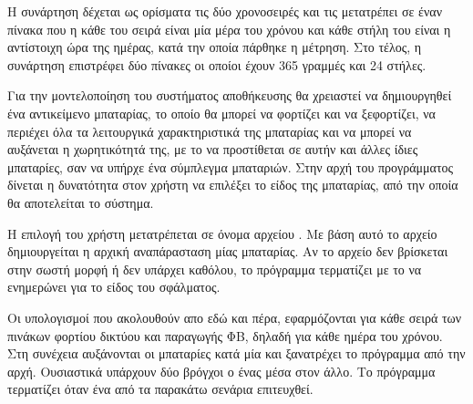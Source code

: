 \documentclass[12pt]{report}
\begin{document}
{Η συνάρτηση {} δέχεται ως ορίσματα τις δύο χρονοσειρές και τις μετατρέπει σε έναν πίνακα που η κάθε του σειρά
είναι μία μέρα του χρόνου και κάθε στήλη του είναι η αντίστοιχη ώρα της ημέρας, κατά την οποία πάρθηκε η μέτρηση. 
Στο τέλος, η συνάρτηση επιστρέφει δύο πίνακες οι οποίοι έχουν 365 γραμμές και 24 στήλες.

Για την μοντελοποίηση του συστήματος αποθήκευσης θα χρειαστεί να δημιουργηθεί ένα αντικείμενο μπαταρίας, το οποίο θα 
μπορεί να φορτίζει και να ξεφορτίζει, να περιέχει όλα τα λειτουργικά χαρακτηριστικά της μπαταρίας και να μπορεί να αυξάνεται
η χωρητικότητά της, με το να προστίθεται σε αυτήν και άλλες ίδιες μπαταρίες, σαν να υπήρχε ένα σύμπλεγμα μπαταριών.
Στην αρχή του προγράμματος δίνεται η δυνατότητα στον χρήστη να επιλέξει το είδος της μπαταρίας, από την οποία θα αποτελείται το σύστημα.

{}

Η επιλογή του χρήστη μετατρέπεται σε όνομα αρχείου {}. Με βάση αυτό το αρχείο δημιουργείται η αρχική αναπάρασταση
μίας μπαταρίας. Αν το αρχείο δεν βρίσκεται στην σωστή μορφή ή δεν υπάρχει καθόλου, το πρόγραμμα τερματίζει με το να ενημερώνει για το
είδος του σφάλματος.

{}

Οι υπολογισμοί που ακολουθούν απο εδώ και πέρα, εφαρμόζονται για κάθε σειρά των πινάκων φορτίου δικτύου και παραγωγής ΦΒ,
δηλαδή για κάθε ημέρα του χρόνου. Στη συνέχεια αυξάνονται οι μπαταρίες κατά μία και ξανατρέχει το πρόγραμμα από την αρχή.
Ουσιαστικά υπάρχουν δύο βρόγχοι {} ο ένας μέσα στον άλλο.
Το πρόγραμμα τερματίζει όταν ένα από τα παρακάτω σενάρια επιτευχθεί.

}
\end{document}
